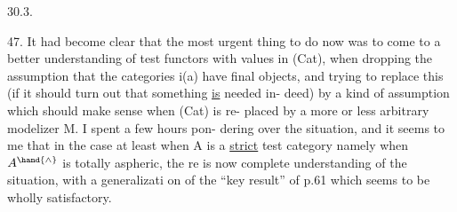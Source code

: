 30.3.

47.     It had become clear that the most urgent thing to do now was to
come to a better understanding of test functors with values in (Cat),  when
dropping the assumption that the categories i(a) have final objects,  and
trying to replace this (if it should turn out that something \uline{is} needed in-%
deed)  by a kind of assumption which should make sense when (Cat) is re-%
placed by a more or less arbitrary modelizer M.  I spent a few hours pon-%
dering over the situation,  and it seems to me that\hand{\unsure{,}} in the case at least
when A is a \uline{strict} test category\hand{,} namely when $A^{\hand{\wedge}}$\hand{/} is totally aspheric,  the\unsure{-}%
re is now   complete understanding of the situation,  with a generalizati\unsure{-}%
on of the ``key result'' of p.61 which seems to be wholly satisfactory.

